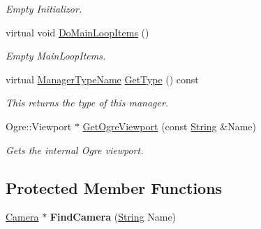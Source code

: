 \begin{DoxyCompactItemize}
\begin{DoxyCompactList}\small\item\em Empty Initializor. \item\end{DoxyCompactList}\item 
virtual void \hyperlink{classphys_1_1CameraManager_aaae22266bccc43f6efa66d2735d7d1d3}{DoMainLoopItems} ()
\begin{DoxyCompactList}\small\item\em Empty MainLoopItems. \item\end{DoxyCompactList}\item 
virtual \hyperlink{classphys_1_1ManagerBase_aaa6ccddf23892eaccb898529414f80a5}{ManagerTypeName} \hyperlink{classphys_1_1CameraManager_a8412ea634307aa280b615a3cc7c9b739}{GetType} () const 
\begin{DoxyCompactList}\small\item\em This returns the type of this manager. \item\end{DoxyCompactList}\item 
Ogre::Viewport $\ast$ \hyperlink{classphys_1_1CameraManager_ac1b9928181ee006fea42152f3ea406cb}{GetOgreViewport} (const \hyperlink{namespacephys_aa03900411993de7fbfec4789bc1d392e}{String} \&Name)
\begin{DoxyCompactList}\small\item\em Gets the internal Ogre viewport. \item\end{DoxyCompactList}\end{DoxyCompactItemize}
\subsection*{Protected Member Functions}
\begin{DoxyCompactItemize}
\item 
\hypertarget{classphys_1_1CameraManager_a17eb1f44fff4fe4af8683cedba0c9fbf}{
\hyperlink{classphys_1_1Camera}{Camera} $\ast$ {\bfseries FindCamera} (\hyperlink{namespacephys_aa03900411993de7fbfec4789bc1d392e}{String} Name)}
\label{d9/d91/classphys_1_1CameraManager_a17eb1f44fff4fe4af8683cedba0c9fbf}

\end{DoxyCompactItemize}

